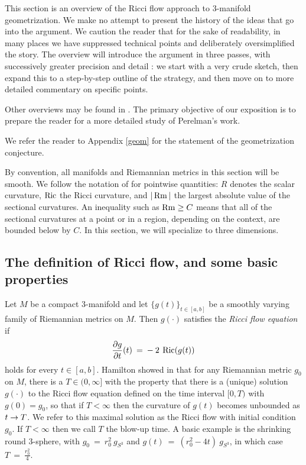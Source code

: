 This section is an overview of the Ricci flow approach to
$3$-manifold geometrization.  We make no attempt to present the
history of the ideas that go into the argument.
We caution the reader that for the sake of readability,
in many places we have suppressed technical points and deliberately
oversimplified the story.
 The overview will introduce the argument in
three passes, with successively greater precision and detail : we start with a
very crude sketch, then expand this to a step-by-step outline of the
strategy, and then move on to more detailed commentary on specific
points.

Other overviews may be found in \cite{Cao-Chow,Morgan}.  The
primary objective of our exposition is
to prepare the reader for a more detailed study of Perelman's work.


We refer the reader to Appendix \ref{geom} for the statement
of the geometrization conjecture.



By convention, all manifolds and Riemannian metrics in this section
will be smooth.
We follow the notation of
\cite{Perelman,Perelman2} for pointwise quantities:  $R$
denotes the scalar curvature,
$\operatorname{Ric}$ the Ricci curvature,  and $|\operatorname{Rm}|$ the largest absolute value of
the sectional curvatures.
An inequality such as $\operatorname{Rm}\geq C$ means that all of the
sectional curvatures at a
point or in a region, depending on the context, are bounded below by $C$.
In this section, we will specialize to three dimensions.


\subsection{The definition of Ricci flow, and some basic properties}


Let $M$ be a compact  $3$-manifold and let $\{g(t)\}_{t\in [a,b]}$
be a smoothly varying family of  Riemannian metrics on $M$.
Then $g(\cdot)$ satisfies the {\em Ricci flow equation} if
\begin{equation}
\frac{\partial g}{\partial t}(t) \: = \:
- \: 2 \: \operatorname{Ric}(g(t))
\end{equation}
holds for every $t\in[a,b]$.
Hamilton showed in \cite{Hamiltonnnnn} that
for any Riemannian metric $g_0$ on $M$, there is a $T\in (0,\infty]$
with the property that there is a (unique) solution $g(\cdot)$
to the Ricci flow equation defined on the time interval $[0,T)$ with
$g(0) = g_0$, so
that if $T<\infty$ then the curvature of $g(t)$ becomes unbounded
as $t\rightarrow T$.  We refer to this maximal solution as the Ricci flow with
initial condition $g_0$. If $T<\infty$ then we call $T$ the blow-up
time.  A basic example
is the shrinking  round $3$-sphere, with $g_0 \: = \: r_0^2 \: g_{S^3}$ and
$g(t) \: = \: (r_0^2 - 4t) \:  g_{S^3}$, in which case $T \: = \: \frac{r_0^2}{4}$.

